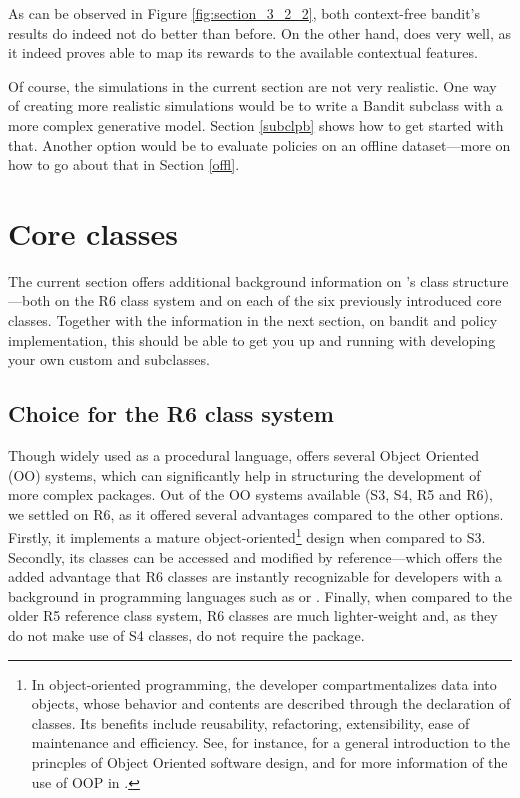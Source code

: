 \documentclass{jss}
\begin{document}
As can be observed in Figure \ref{fig:section_3_2_2}, both context-free bandit's results do indeed not do better than before. On the other hand,  does very well, as it indeed proves able to map its rewards to the available contextual features.

Of course, the simulations in the current section are not very realistic. One way of creating more realistic simulations would be to write a Bandit subclass with a more complex generative model. Section \ref{subclpb} shows how to get started with that. Another option would be to evaluate policies on an offline dataset---more on how to go about that in Section \ref{offl}.

\section{Core classes} \label{classstructure}

The current section offers additional background information on 's class structure---both on the R6 class system \cite{R6} and on each of the six previously introduced core  classes. Together with the information in the next section, on bandit and policy implementation, this should be able to get you up and running with developing your own custom  and  subclasses.

\subsection{Choice for the R6 class system} \label{classsystem}

Though widely used as a procedural language,  offers several Object Oriented (OO) systems, which can significantly help in structuring the development of more complex packages. Out of the OO systems available (S3, S4, R5 and R6), we settled on R6, as it offered several advantages compared to the other options. Firstly, it implements a mature object-oriented\footnote{In object-oriented programming, the developer compartmentalizes data into objects, whose behavior and contents are described through the declaration of classes. Its benefits include reusability, refactoring, extensibility, ease of maintenance and efficiency. See, for instance, \cite{Wirfs-Brock1990} for a general introduction to the princples of Object Oriented software design, and \cite{wickham2014advanced} for more information of the use of OOP in .} design when compared to S3. Secondly, its classes can be accessed and modified by reference---which offers the added advantage that R6 classes are instantly recognizable for developers with a background in programming languages such as  or . Finally, when compared to the older R5 reference class system, R6 classes are much lighter-weight and, as they do not make use of S4 classes, do not require the  package.
\end{document}
